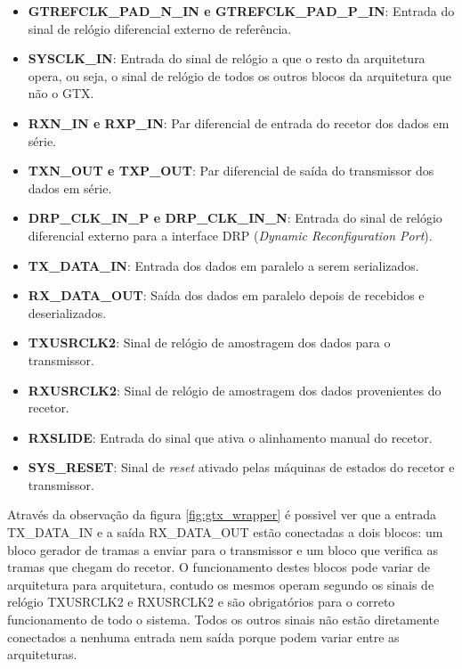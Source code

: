 \begin{itemize}
	\item \textbf{GTREFCLK\_PAD\_N\_IN e GTREFCLK\_PAD\_P\_IN}:  Entrada do sinal de relógio diferencial externo de referência.
	
	\item \textbf{SYSCLK\_IN}: Entrada do sinal de relógio a que o resto da arquitetura opera, ou seja, o sinal de relógio de todos os outros blocos da arquitetura que não o GTX.
	
	\item \textbf{RXN\_IN e RXP\_IN}: Par diferencial de entrada do recetor  dos dados em série.
	
	\item \textbf{TXN\_OUT e TXP\_OUT}: Par diferencial de saída do transmissor dos dados em série.

	\item \textbf{DRP\_CLK\_IN\_P e DRP\_CLK\_IN\_N}: Entrada do sinal de relógio diferencial externo para a interface DRP (\textit{Dynamic Reconfiguration Port}). 
	
	\item \textbf{TX\_DATA\_IN}: Entrada dos dados em paralelo a serem serializados.
	
	\item \textbf{RX\_DATA\_OUT}: Saída dos dados em paralelo depois de recebidos e deserializados. 
	
	\item \textbf{TXUSRCLK2}: Sinal de relógio de amostragem dos dados para o transmissor.
	
	\item \textbf{RXUSRCLK2}: Sinal de relógio de amostragem dos dados provenientes do recetor.
	
	\item \textbf{RXSLIDE}: Entrada do sinal que ativa o alinhamento manual do recetor.
	
	\item \textbf{SYS\_RESET}: Sinal de \textit{reset} ativado pelas máquinas de estados do recetor e transmissor.
	
\end{itemize}

Através da observação da figura \ref{fig:gtx_wrapper} é possivel ver que a entrada TX\_DATA\_IN e a saída RX\_DATA\_OUT estão conectadas a dois blocos: um bloco gerador de tramas a enviar para o transmissor e um bloco que verifica as tramas que chegam do recetor. O funcionamento destes blocos pode variar de arquitetura para arquitetura, contudo os mesmos operam segundo os sinais de relógio TXUSRCLK2 e RXUSRCLK2 e são obrigatórios para o correto funcionamento de todo o sistema. Todos os outros sinais não estão diretamente conectados a nenhuma entrada nem saída porque podem variar entre as arquiteturas.

